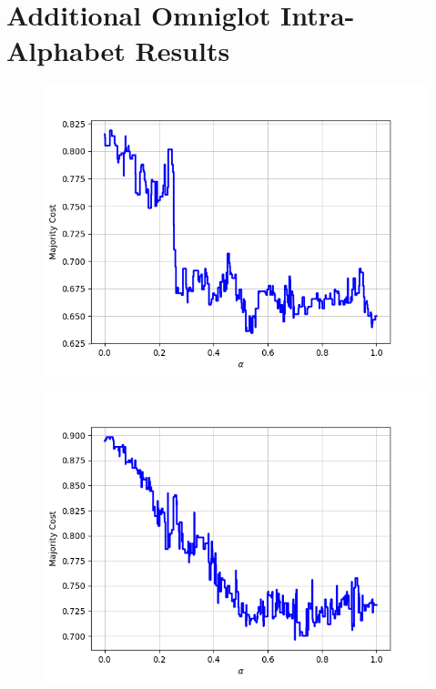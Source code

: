 \chapter{Additional Omniglot Intra-Alphabet Results}
\label{app:omniglot}

\begin{figure}[H]
\centering
\begin{minipage}{.24\textwidth}
  \centering
  {\includegraphics[width=\linewidth]{plots/omniglot-intra-ac/Alphabet_of_the_Magi}}
\end{minipage}
\begin{minipage}{.24\textwidth}
  \centering
  {\includegraphics[width=\linewidth]{plots/omniglot-intra-ac/Anglo-Saxon_Futhorc}}

\end{minipage}
\end{figure}
